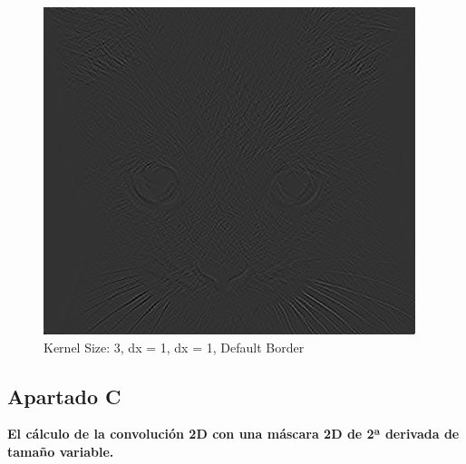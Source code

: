 \documentclass{article}
\begin{document}
\begin{minipage}{\linewidth}
    \centering
    \begin{minipage}{0.45\linewidth}
        \begin{figure}[H]
			\includegraphics[width=\linewidth]{Ejercicio2b/cat(3,1,1)_DEFAULT.png}             
			\caption{Kernel Size: 3, dx = 1, dx = 1,  Default Border}
        \end{figure}
    \end{minipage}   
\end{minipage}

\subsection*{Apartado C}
\textbf{El cálculo de la convolución 2D con una máscara 2D de 2ª derivada de tamaño variable.}
\end{document}
